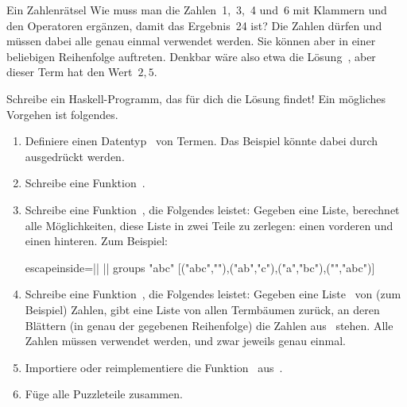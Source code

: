 \documentclass{uebblatt}
\begin{document}
\begin{aufgabe}{Ein Zahlenrätsel}
Wie muss man die Zahlen~1,~3,~4 und~6 mit Klammern und den Operatoren
\haskellinline{+ * - /} ergänzen, damit das Ergebnis~24 ist? Die Zahlen dürfen
und müssen dabei alle genau einmal verwendet werden. Sie können aber in einer
beliebigen Reihenfolge auftreten. Denkbar wäre also etwa die
Lösung~, aber dieser Term hat den Wert~$2{,}5$.

Schreibe ein Haskell-Programm, das für dich die Lösung findet! Ein mögliches
Vorgehen ist folgendes.

\begin{enumerate}
\item Definiere einen Datentyp~ von Termen.
Das Beispiel könnte dabei durch~ ausgedrückt werden.
\item Schreibe eine Funktion~.
\item Schreibe eine Funktion~, die
Folgendes leistet: Gegeben eine Liste, berechnet alle Möglichkeiten, diese Liste in zwei
Teile zu zerlegen: einen vorderen und einen hinteren. Zum Beispiel:
\begin{haskellcode*}{escapeinside=||}
|\ghci| groups "abc"
[("abc",""),("ab","c"),("a","bc"),("","abc")]
\end{haskellcode*}
\item Schreibe eine Funktion~, die
Folgendes leistet: Gegeben eine Liste~ von (zum Beispiel)
Zahlen, gibt eine Liste von allen Termbäumen zurück, an deren Blättern (in
genau der gegebenen Reihenfolge) die Zahlen aus~ stehen. Alle Zahlen
müssen verwendet werden, und zwar jeweils genau einmal.
\item Importiere oder reimplementiere die Funktion~ aus~.
\item Füge alle Puzzleteile zusammen.
\end{enumerate}
\end{aufgabe}
\end{document}
